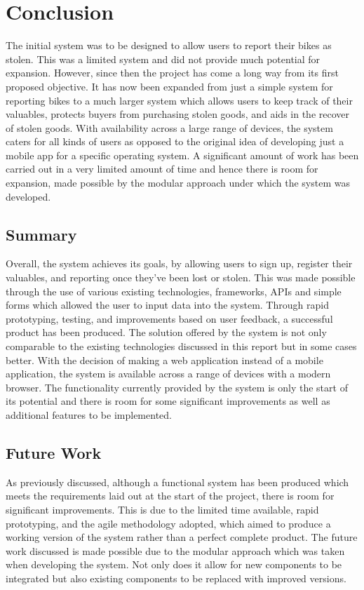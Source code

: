 \section{Conclusion}

The initial system was to be designed to allow users to report their bikes as stolen. This was a limited system and did not provide much potential for expansion. However, since then the project has come a long way from its first proposed objective. It has now been expanded from just a simple system for reporting bikes to a much larger system which allows users to keep track of their valuables, protects buyers from purchasing stolen goods, and aids in the recover of stolen goods. With availability across a large range of devices, the system caters for all kinds of users as opposed to the original idea of developing just a mobile app for a specific operating system. A significant amount of work has been carried out in a very limited amount of time and hence there is room for expansion, made possible by the modular approach under which the system was developed.

\subsection{Summary}

Overall, the system achieves its goals, by allowing users to sign up, register their valuables, and reporting once they've been lost or stolen. This was made possible through the use of various existing technologies, frameworks, APIs and simple forms which allowed the user to input data into the system. Through rapid prototyping, testing, and improvements based on user feedback, a successful product has been produced. The solution offered by the system is not only comparable to the existing technologies discussed in this report but in some cases better. With the decision of making a web application instead of a mobile application, the system is available across a range of devices with a modern browser. The functionality currently provided by the system is only the start of its potential and there is room for some significant improvements as well as additional features to be implemented.

\subsection{Future Work}
As previously discussed, although a functional system has been produced which meets the requirements laid out at the start of the project, there is room for significant improvements. This is due to the limited time available, rapid prototyping, and the agile methodology adopted, which aimed to produce a working version of the system rather than a perfect complete product. The future work discussed is made possible due to the modular approach which was taken when developing the system. Not only does it allow for new components to be integrated but also existing components to be replaced with improved versions.

